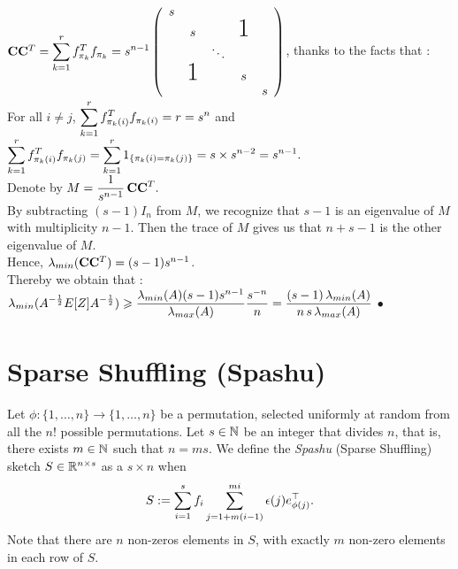  
 
$\bold{C} \bold{C}^{T}= \dsp\sum\limits_{k=1}^{r} f_{\pi_{k}}^{T} f_{\pi_{k}} = s^{n-1}
    \left(
    \begin{array}{ccccc}
    s                                    \\
      & s             &   & \text{\huge1}\\
      &               & \ddots               \\
      & \text{\huge1} &   & s            \\
      &               &   &   & s
    \end{array}
    \right)$, thanks to the facts that :\\ For all $i\neq j$, $\displaystyle\sum\limits_{k=1}^{r} f_{\pi_{k}(i)}^{T} f_{\pi_{k}(i)} = r = s^{n}$ and $\displaystyle\sum\limits_{k=1}^{r} f_{\pi_{k}(i)}^{T} f_{\pi_{k}(j)} = \displaystyle\sum\limits_{k=1}^{r} 1_{\left\{\pi_{k}(i) = \pi_{k}(j)\right\}} = s \times s^{n-2} = s^{n-1}.$\\
Denote by $\displaystyle M = \frac{1}{s^{n-1}}\, \bold{C} \bold{C}^{T}.$\\

By subtracting $(s-1)I_{n}$ from $M$, we recognize that $s-1$ is an eigenvalue of $M$ with multiplicity $n-1$. Then the trace of $M$ gives us that $n+s-1$ is the other eigenvalue of $M$.\\ 
Hence, $\lambda_{min}(\bold{C} \bold{C}^{T}) = (s-1)s^{n-1}$.\\

Thereby we obtain that :\\ 


$\displaystyle \lambda_{min}(A^{-\frac12}E[Z]A^{-\frac12} )  \geqslant  \frac{\lambda_{min}(A) (s-1)s^{n-1}}{ \lambda_{max}(A)}  \frac{s^{-n}}{n} =  \frac{(s-1)\,\lambda_{min}(A)}{n \, s \,\lambda_{max}(A)} $ $\bullet$


\section{Sparse Shuffling (Spashu)}

Let $\phi: \{1,\ldots, n\} \rightarrow \{1,\ldots, n\}$ be a permutation, selected uniformly at random from all the $n!$ possible permutations. Let $s\in {\mathbb N}$ be an integer that divides $n$, that is, there exists $m \in {\mathbb N}$ such that $n = ms.$ We define the \emph{Spashu} (Sparse Shuffling) sketch $S \in {\mathbb R}^{n \times s}$ as a $s\times n$  when
 \[S := \displaystyle\sum_{i=1}^s f_i \sum_{j=1+m(i-1)}^{mi} \epsilon(j)e_{\phi(j)}^\top.\]
 Note that there are $n$ non-zeros elements in $S$, with exactly $m$ non-zero elements in each row of $S$.
 
